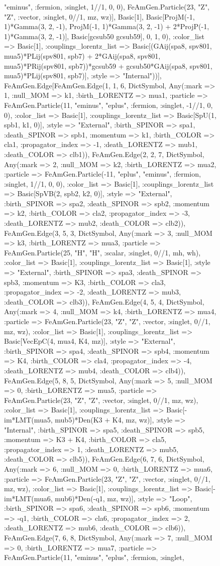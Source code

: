 \documentclass{revtex4}
\begin{document}
\begin{figure}[!htb]
\begin{center}
{"eminus", :fermion, :singlet, 1//1, 0, 0), FeAmGen.Particle(23, "Z", "Z", :vector, :singlet, 0//1, mz, wz)], Basic[1], Basic[ProjM(-1, 1)*Gamma(3, 2, -1), ProjM(-1, 1)*Gamma(3, 2, -1) + 2*ProjP(-1, 1)*Gamma(3, 2, -1)], Basic[gcsub50 gcsub59], 0, 1, 0), :color_list => Basic[1], :couplings_lorentz_list => Basic[(GAij(spa8, spv801, mua5)*PLij(spv801, spb7) + 2*GAij(spa8, spv801, mua5)*PRij(spv801, spb7))*gcsub59 + gcsub50*GAij(spa8, spv801, mua5)*PLij(spv801, spb7)], :style => "Internal"))], FeAmGen.Edge[FeAmGen.Edge(1, 1, 6, Dict{Symbol, Any}(:mark => 1, :null_MOM => k1, :birth_LORENTZ => mua1, :particle => FeAmGen.Particle(11, "eminus", "eplus", :fermion, :singlet, -1//1, 0, 0), :color_list => Basic[1], :couplings_lorentz_list => Basic[SpU(1, spb1, k1, 0)], :style => "External", :birth_SPINOR => spa1, :death_SPINOR => spb1, :momentum => k1, :birth_COLOR => cla1, :propagator_index => -1, :death_LORENTZ => mub1, :death_COLOR => clb1)), FeAmGen.Edge(2, 2, 7, Dict{Symbol, Any}(:mark => 2, :null_MOM => k2, :birth_LORENTZ => mua2, :particle => FeAmGen.Particle(-11, "eplus", "eminus", :fermion, :singlet, 1//1, 0, 0), :color_list => Basic[1], :couplings_lorentz_list => Basic[SpVB(2, spb2, k2, 0)], :style => "External", :birth_SPINOR => spa2, :death_SPINOR => spb2, :momentum => k2, :birth_COLOR => cla2, :propagator_index => -3, :death_LORENTZ => mub2, :death_COLOR => clb2)), FeAmGen.Edge(3, 5, 3, Dict{Symbol, Any}(:mark => 3, :null_MOM => k3, :birth_LORENTZ => mua3, :particle => FeAmGen.Particle(25, "H", "H", :scalar, :singlet, 0//1, mh, wh), :color_list => Basic[1], :couplings_lorentz_list => Basic[1], :style => "External", :birth_SPINOR => spa3, :death_SPINOR => spb3, :momentum => K3, :birth_COLOR => cla3, :propagator_index => -2, :death_LORENTZ => mub3, :death_COLOR => clb3)), FeAmGen.Edge(4, 5, 4, Dict{Symbol, Any}(:mark => 4, :null_MOM => k4, :birth_LORENTZ => mua4, :particle => FeAmGen.Particle(23, "Z", "Z", :vector, :singlet, 0//1, mz, wz), :color_list => Basic[1], :couplings_lorentz_list => Basic[VecEpC(4, mua4, K4, mz)], :style => "External", :birth_SPINOR => spa4, :death_SPINOR => spb4, :momentum => K4, :birth_COLOR => cla4, :propagator_index => -4, :death_LORENTZ => mub4, :death_COLOR => clb4)), FeAmGen.Edge(5, 8, 5, Dict{Symbol, Any}(:mark => 5, :null_MOM => 0, :birth_LORENTZ => mua5, :particle => FeAmGen.Particle(23, "Z", "Z", :vector, :singlet, 0//1, mz, wz), :color_list => Basic[1], :couplings_lorentz_list => Basic[-im*LMT(mua5, mub5)*Den(K3 + K4, mz, wz)], :style => "Internal", :birth_SPINOR => spa5, :death_SPINOR => spb5, :momentum => K3 + K4, :birth_COLOR => cla5, :propagator_index => 1, :death_LORENTZ => mub5, :death_COLOR => clb5)), FeAmGen.Edge(6, 7, 6, Dict{Symbol, Any}(:mark => 6, :null_MOM => 0, :birth_LORENTZ => mua6, :particle => FeAmGen.Particle(23, "Z", "Z", :vector, :singlet, 0//1, mz, wz), :color_list => Basic[1], :couplings_lorentz_list => Basic[-im*LMT(mua6, mub6)*Den(-q1, mz, wz)], :style => "Loop", :birth_SPINOR => spa6, :death_SPINOR => spb6, :momentum => -q1, :birth_COLOR => cla6, :propagator_index => 2, :death_LORENTZ => mub6, :death_COLOR => clb6)), FeAmGen.Edge(7, 6, 8, Dict{Symbol, Any}(:mark => 7, :null_MOM => 0, :birth_LORENTZ => mua7, :particle => FeAmGen.Particle(11, "eminus", "eplus", :fermion, :singlet, }
\end{center}
\end{figure}
\end{document}
